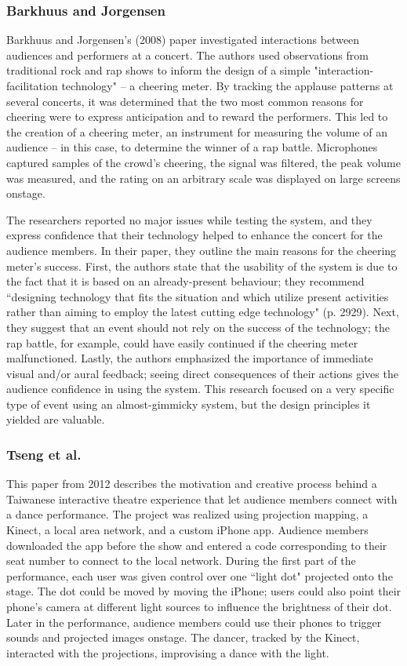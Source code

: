 \subsubsection{Barkhuus and Jorgensen}

Barkhuus and Jorgensen's (2008) paper investigated interactions between audiences and performers at a concert. The authors used observations from traditional rock and rap shows to inform the design of a simple "interaction-facilitation technology" -- a cheering meter. By tracking the applause patterns at several concerts, it was determined that the two most common reasons for cheering were to express anticipation and to reward the performers. This led to the creation of a cheering meter, an instrument for measuring the volume of an audience -- in this case, to determine the winner of a rap battle. Microphones captured samples of the crowd's cheering, the signal was filtered, the peak volume was measured, and the rating on an arbitrary scale was displayed on large screens onstage.

The researchers reported no major issues while testing the system, and they express confidence that their technology helped to enhance the concert for the audience members. In their paper, they outline the main reasons for the cheering meter's success. First, the authors state that the usability of the system is due to the fact that it is based on an already-present behaviour; they recommend ``designing technology that fits the situation and which utilize present activities rather than aiming to employ the latest cutting edge technology" (p. 2929). Next, they suggest that an event should not rely on the success of the technology; the rap battle, for example, could have easily continued if the cheering meter malfunctioned. Lastly, the authors emphasized the importance of immediate visual and/or aural feedback; seeing direct consequences of their actions gives the audience confidence in using the system. This research focused on a very specific type of event using an almost-gimmicky system, but the design principles it yielded are valuable.

\subsubsection{Tseng et al.}

This paper from 2012 describes the motivation and creative process behind a Taiwanese interactive theatre experience that let audience members connect with a dance performance. The project was realized using projection mapping, a Kinect, a local area network, and a custom iPhone app. Audience members downloaded the app before the show and entered a code corresponding to their seat number to connect to the local network. During the first part of the performance, each user was given control over one ``light dot" projected onto the stage. The dot could be moved by moving the iPhone; users could also point their phone's camera at different light sources to influence the brightness of their dot. Later in the performance, audience members could use their phones to trigger sounds and projected images onstage. The dancer, tracked by the Kinect, interacted with the projections, improvising a dance with the light.


